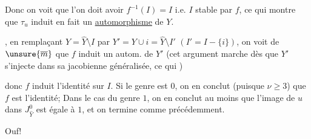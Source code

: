 

 Donc on voit que l'on doit avoir $f^{-1}(I)=I$ i.e. $I$ stable par $f$, ce qui montre que $\tau_u$ induit en fait un \uline{automorphisme} de $Y$.


, en remplaçant $Y=\widehat Y\setminus I$ par $Y'=Y\cup i=\widehat Y\setminus I'$ $(I'=I-\{i\})$, on voit de $\unsure{\overline m}$ que $f$ induit un autom. de $Y'$ (cet argument marche dès que $Y'$ s'injecte dans sa jacobienne généralisée, ce qui  )

 donc $f$ induit l'identité sur $I$. Si le genre est $0$, on en conclut (puisque $\nu\geq3$) que $f$ est l'identité;  Dans le cas du genre $1$, on en conclut au moins que l'image de $u$ dans $J_{\widehat Y}^0$ est égale à $1$, et on termine comme précédemment.

Ouf!
